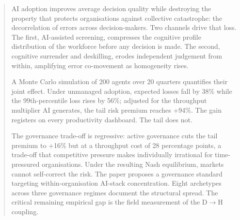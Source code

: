 \documentclass[11pt,a4paper]{article}
\begin{document}
\begin{abstract}
AI adoption improves average decision quality while destroying the property that
protects organisations against collective catastrophe: the decorrelation of errors
across decision-makers. Two channels drive that loss. The first, AI-assisted
screening, compresses the cognitive profile distribution of the workforce before
any decision is made. The second, cognitive surrender and deskilling, erodes
independent judgement from within, amplifying error co-movement as homogeneity
rises.

A Monte Carlo simulation of 200 agents over 20 quarters quantifies their joint
effect. Under unmanaged adoption, expected losses fall by 38\% while the
99th-percentile loss rises by 56\%; adjusted for the throughput multiplier AI
generates, the tail risk premium reaches +94\%. The gain registers on every
productivity dashboard. The tail does not.

The governance trade-off is regressive: active governance cuts the tail premium
to +16\% but at a throughput cost of 28 percentage points, a trade-off that
competitive pressure makes individually irrational for time-pressured
organisations. Under the resulting Nash equilibrium, markets cannot self-correct
the risk. The paper proposes a governance standard targeting within-organisation
AI-stack concentration. Eight archetypes across three governance regimes document
the structural spread. The critical remaining empirical gap is the field
measurement of the D$\rightarrow$H coupling.
\end{abstract}

\clearpage
\tableofcontents
\clearpage
\end{document}
